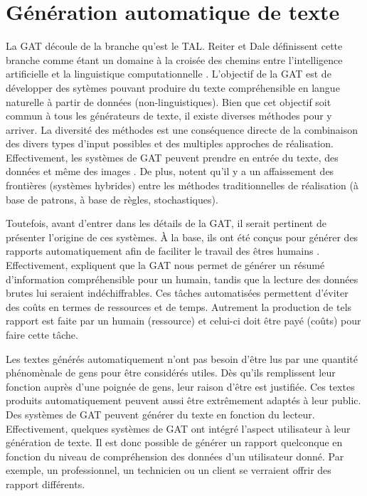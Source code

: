 
\chapter{Génération automatique de texte}


La \acf{GAT} découle de la branche qu'est le \acf{TAL}. Reiter et Dale  définissent cette branche comme étant un domaine à la croisée des chemins entre l'intelligence artificielle et la linguistique computationnelle \citep{ReiterBuildingNaturalLanguage2000}. L'objectif de la \ac{GAT} est de développer des sytèmes pouvant produire du texte compréhensible en langue naturelle à partir de données (non-linguistiques). Bien que cet objectif soit commun à tous les générateurs de texte, il existe diverses méthodes pour y arriver. La diversité des méthodes est une conséquence directe de la combinaison des divers types d'input possibles et des multiples approches de réalisation. Effectivement, les systèmes de \ac{GAT} peuvent prendre en entrée du texte, des données et même des images \citep{thomason:coling14}. De plus, \cite{gatt18} notent qu'il y a un affaissement des frontières (systèmes hybrides) entre les méthodes traditionnelles de réalisation (à base de patrons, à base de règles, stochastiques).

Toutefois, avant d'entrer dans les détails de la \ac{GAT}, il serait pertinent de présenter l'origine de ces systèmes. À la base, ils ont été conçus pour générer des rapports automatiquement afin de faciliter le travail des êtres humains \citep{ReiterBuildingNaturalLanguage2000}. Effectivement, \cite{DaoustJSREALTextRealizer2015} expliquent que la \ac{GAT} nous permet de générer un résumé d'information compréhensible pour un humain, tandis que la lecture des données brutes lui seraient indéchiffrables. Ces tâches automatisées permettent d'éviter des coûts en termes de ressources et de temps. Autrement la production de tels rapport est faite par un humain (ressource) et celui-ci doit être payé (coûts) pour faire cette tâche.  

Les textes générés automatiquement n'ont pas besoin d'être lus par une quantité phénomènale de gens pour être considérés utiles. Dès qu'ils remplissent leur fonction auprès d'une poignée de gens, leur raison d'être est justifiée. Ces textes produits automatiquement peuvent aussi être extrêmement adaptés à leur public. Des systèmes de \ac{GAT} peuvent générer du texte en fonction du lecteur. Effectivement, quelques systèmes de \ac{GAT} ont intégré l'aspect utilisateur à leur génération de texte. Il est donc possible de générer un rapport quelconque en fonction du niveau de compréhension des données d'un utilisateur donné. Par exemple, un professionnel, un technicien ou un client \citep{1948c0b7a8ca42679cad977bb2cdddc2} se verraient offrir des rapport différents. 


